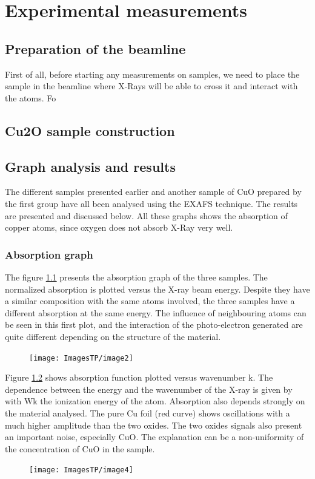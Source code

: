 \documentclass[11pt,a4paper,oneside]{report}
\begin{document}
\newpage



\chapter{Experimental measurements}
\section{Preparation of the beamline}
First of all, before starting any measurements on samples, we need to place the sample in the beamline where X-Rays will be able to cross it and interact with the atoms. Fo


\section{Cu2O sample construction}


\section{Graph analysis and results} \label{results}
The different samples presented earlier and another sample of CuO prepared by the first group have all been analysed using the EXAFS technique. The results are presented and discussed below. All these graphs shows the absorption of copper atoms, since oxygen does not absorb X-Ray very well.

\subsection{Absorption graph}
The figure \ref{graph1} presents the absorption graph of the three samples. The normalized absorption is plotted versus the X-ray beam energy. Despite they have a similar composition with the same atoms involved, the three samples have a different absorption at the same energy. The influence of neighbouring atoms can be seen in this first plot, and the interaction of the photo-electron generated are quite different depending on the structure of the material.
\begin{figure}[H]
    \begin{center}
        \texttt{[image: ImagesTP/image2]}
        \caption{}
        \label{graph1}
    \end{center}
\end{figure}

Figure \ref{graph2} shows absorption function plotted versus wavenumber k. The dependence between the energy and the wavenumber of the X-ray is given by   with Wk the ionization energy of the atom.
Absorption also depends strongly on the material analysed. The pure Cu foil (red curve) shows oscillations with a much higher amplitude than the two oxides. The two oxides signals also present an important noise, especially CuO. The explanation can be a non-uniformity of the concentration of CuO in the sample.
\begin{figure}[H]
    \begin{center}
        \texttt{[image: ImagesTP/image4]}
        \caption{}
        \label{graph2}
    \end{center}
\end{figure}
\end{document}
